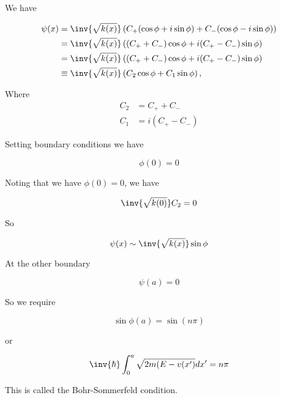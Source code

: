 We have

\begin{align*}
\psi(x) 
&= \inv{\sqrt{k(x)}} \left( 
C_{+}(\cos \phi + i\sin\phi) + C_{-}(\cos\phi - i \sin\phi)
\right) \\
&= \inv{\sqrt{k(x)}} \left( 
(C_{+} + C_{-})\cos \phi + i(C_{+} - C_{-}) \sin\phi
\right) \\
&= \inv{\sqrt{k(x)}} \left( 
(C_{+} + C_{-})\cos \phi + i(C_{+} - C_{-}) \sin\phi
\right) \\
&\equiv 
\inv{\sqrt{k(x)}} \left( 
C_2 \cos \phi + C_1 \sin\phi
\right),
\end{align*}

Where
\begin{align}\label{eqn:qmTwoR3:85}
C_2 &= C_{+} + C_{-} \\
C_1 &= i( C_{+} - C_{-})
\end{align}

Setting boundary conditions we have

\begin{equation}\label{eqn:qmTwoR3:90}
\phi(0) = 0
\end{equation}

Noting that we have $\phi(0) = 0$, we have

\begin{equation}\label{eqn:qmTwoR3:110}
\inv{\sqrt{k(0)}} C_2 = 0
\end{equation}

So

\begin{equation}\label{eqn:qmTwoR3:130}
\psi(x) 
\sim
\inv{\sqrt{k(x)}} \sin\phi
\end{equation}

At the other boundary

\begin{equation}\label{eqn:qmTwoR3:150}
\psi(a) = 0
\end{equation}

So we require

\begin{equation}\label{eqn:qmTwoR3:170}
\sin \phi(a) = \sin(n \pi)
\end{equation}

or

\begin{equation}\label{eqn:qmTwoR3:190}
\inv{\hbar} \int_0^a \sqrt{2 m (E - v(x')} dx' = n \pi
\end{equation}

This is called the Bohr-Sommerfeld condition.

